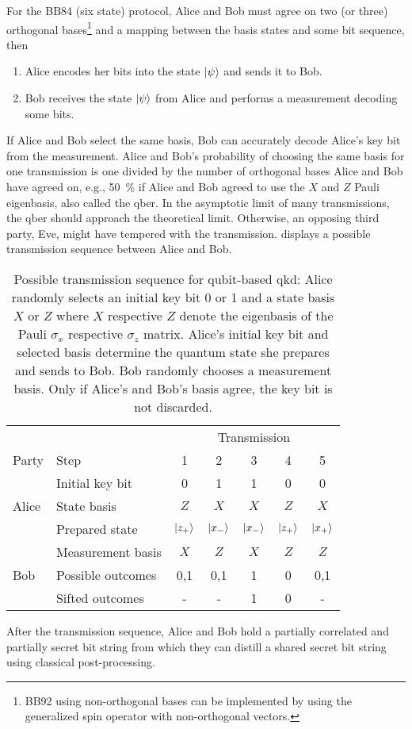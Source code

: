 For the BB84 (six state) protocol, Alice and Bob must agree on two (or three) orthogonal bases\footnote{BB92 using non-orthogonal bases can be implemented by using the generalized spin operator with non-orthogonal vectors.} and a mapping between the basis states and some bit sequence, then
\begin{enumerate}
	\item Alice encodes her bits into the state $\ket{\psi}$ and sends it to Bob.
	\item Bob receives the state $\ket{\psi}$ from Alice and performs a measurement decoding some bits.
\end{enumerate}
If Alice and Bob select the same basis, Bob can accurately decode Alice's key bit from the measurement.
Alice and Bob's probability of choosing the same basis for one transmission is one divided by the number of orthogonal bases Alice and Bob have agreed on, e.g., \SI{50}{\percent} if Alice and Bob agreed to use the $X$ and $Z$ Pauli eigenbasis, also called the \gls{qber}.
In the asymptotic limit of many transmissions, the \gls{qber} should approach the theoretical limit.
Otherwise, an opposing third party, Eve, might have tempered with the transmission.
 displays a possible transmission sequence between Alice and Bob.
\begin{table}[htb]
	\centering
	\begin{tabular}{llccccc}
		\toprule
		& & \multicolumn{5}{c}{Transmission} \\
		\cmidrule{3-7}
		Party & Step & 1 & 2 & 3 & 4 & 5 \\ 
		\midrule
		\multirow{3}{*}{Alice} & Initial key bit & \num{0} & \num{1} & \num{1} & \num{0} & \num{0} \\
		& State basis & $Z$ & $X$ & $X$ & $Z$ & $X$ \\
		& Prepared state & $\ket{z_+}$ & $\ket{x_-}$ & $\ket{x_-}$ & $\ket{z_+}$ & $\ket{x_+}$ \\
		\cmidrule{1-1}
		\multirow{3}{*}{Bob} & Measurement basis & $X$ & $Z$ & $X$ & $Z$ & $Z$ \\
		& Possible outcomes & \num{0},\num{1} & \num{0},\num{1} & \num{1} & \num{0} & \num{0},\num{1} \\
		& Sifted outcomes & - & - & 1 & 0 & - \\
		\bottomrule
	\end{tabular}
	\caption{Possible transmission sequence for qubit-based \gls{qkd}: Alice randomly selects an initial key bit \num{0} or \num{1} and a state basis $X$ or $Z$ where $X$ respective $Z$ denote the eigenbasis of the Pauli $\sigma_x$ respective $\sigma_z$ matrix. Alice's initial key bit and selected basis determine the quantum state she prepares and sends to Bob. Bob randomly chooses a measurement basis. Only if Alice's and Bob's basis agree, the key bit is not discarded.}\label{tab:qubit_transmission_sequence}
\end{table}
After the transmission sequence, Alice and Bob hold a partially correlated and partially secret bit string from which they can distill a shared secret bit string using classical post-processing.

